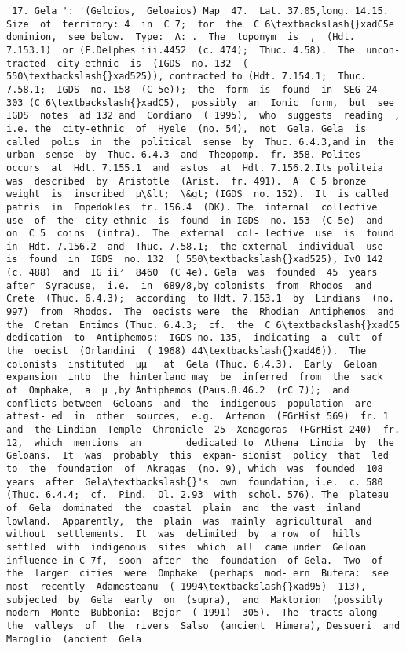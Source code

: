 \documentclass[11pt]{article}
\begin{document}
\begin{Verbatim}[commandchars=\\\{\}]
         '17. Gela ': '(Geloios,  Geloaios) Map  47.  Lat. 37.05,long. 14.15.  Size  of  territory: 4  in  C 7;  for  the  C 6\textbackslash{}xadC5e  dominion,  see below.  Type:  A: .  The  toponym  is  ,  (Hdt. 7.153.1)  or (F.Delphes iii.4452  (c. 474);  Thuc. 4.58).  The  uncon- tracted  city-ethnic  is  (IGDS  no. 132  ( 550\textbackslash{}xad525)), contracted to (Hdt. 7.154.1;  Thuc. 7.58.1;  IGDS  no. 158  (C 5e));  the  form  is  found  in  SEG 24  303 (C 6\textbackslash{}xadC5),  possibly  an  Ionic  form,  but  see  IGDS  notes  ad 132 and  Cordiano  ( 1995),  who  suggests  reading  ,  i.e. the  city-ethnic  of  Hyele  (no. 54),  not  Gela. Gela  is  called  polis  in  the  political  sense  by  Thuc. 6.4.3,and in  the  urban  sense  by  Thuc. 6.4.3  and  Theopomp.  fr. 358. Polites  occurs  at  Hdt. 7.155.1  and  astos  at  Hdt. 7.156.2.Its politeia  was  described  by  Aristotle  (Arist.  fr. 491).  A  C 5 bronze  weight  is  inscribed  µ\&lt;  \&gt; (IGDS  no. 152).  It  is called  patris  in  Empedokles  fr. 156.4  (DK). The  internal  collective  use  of  the  city-ethnic  is  found  in IGDS  no. 153  (C 5e)  and  on  C 5  coins  (infra).  The  external  col- lective  use  is  found  in  Hdt. 7.156.2  and  Thuc. 7.58.1;  the external  individual  use  is  found  in  IGDS  no. 132  ( 550\textbackslash{}xad525), IvO 142  (c. 488)  and  IG ii²  8460  (C 4e). Gela  was  founded  45  years  after  Syracuse,  i.e.  in  689/8,by colonists  from  Rhodos  and  Crete  (Thuc. 6.4.3);  according  to Hdt. 7.153.1  by  Lindians  (no. 997)  from  Rhodos.  The  oecists were  the  Rhodian  Antiphemos  and  the  Cretan  Entimos (Thuc. 6.4.3;  cf.  the  C 6\textbackslash{}xadC5  dedication  to  Antiphemos:  IGDS no. 135,  indicating  a  cult  of  the  oecist  (Orlandini  ( 1968) 44\textbackslash{}xad46)).  The  colonists  instituted  µµ   at  Gela (Thuc. 6.4.3).  Early  Geloan  expansion  into  the  hinterland may  be  inferred  from  the  sack  of  Omphake,  a  µ ,by Antiphemos (Paus.8.46.2  (rC 7));  and  conflicts between  Geloans  and  the  indigenous  population  are  attest- ed  in  other  sources,  e.g.  Artemon  (FGrHist 569)  fr. 1  and  the Lindian  Temple  Chronicle  25  Xenagoras  (FGrHist 240)  fr. 12,  which  mentions  an        dedicated to  Athena  Lindia  by  the  Geloans.  It  was  probably  this  expan- sionist  policy  that  led  to  the  foundation  of  Akragas  (no. 9), which  was  founded  108  years  after  Gela\textbackslash{}'s  own  foundation, i.e.  c. 580  (Thuc. 6.4.4;  cf.  Pind.  Ol. 2.93  with  schol. 576). The  plateau  of  Gela  dominated  the  coastal  plain  and  the vast  inland  lowland.  Apparently,  the  plain  was  mainly  agricultural  and  without  settlements.  It  was  delimited  by  a row  of  hills  settled  with  indigenous  sites  which  all  came under  Geloan  influence in C 7f,  soon  after  the  foundation  of Gela.  Two  of  the  larger  cities  were  Omphake  (perhaps  mod- ern  Butera:  see  most  recently  Adamesteanu  ( 1994\textbackslash{}xad95)  113), subjected  by  Gela  early  on  (supra),  and  Maktorion  (possibly modern  Monte  Bubbonia:  Bejor  ( 1991)  305).  The  tracts along  the  valleys  of  the  rivers  Salso  (ancient  Himera), Dessueri  and  Maroglio  (ancient  Gela  
\end{Verbatim}
\end{document}

